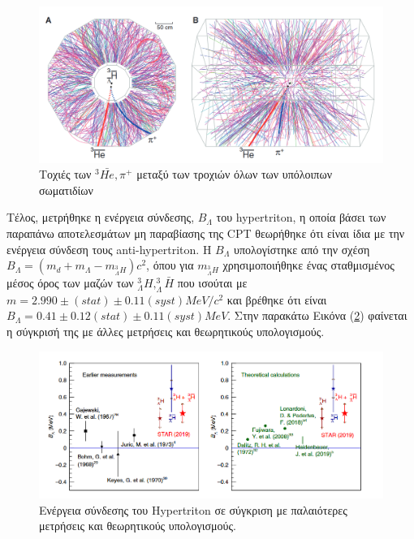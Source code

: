 			\begin{figure}[h!]
				\centering
				\includegraphics[scale=0.5]{STAR_Results/hypertriton_traj}
				\caption{Τοχιές των $ ^3\bar{He}, \pi^+$ μεταξύ των τροχιών όλων των υπόλοιπων σωματιδίων }
				\label{fig4.13}
			\end{figure}
			
Τέλος, μετρήθηκε η ενέργεια σύνδεσης, $B_\Lambda$ του hypertriton, η οποία βάσει των παραπάνω αποτελεσμάτων μη παραβίασης της CPT θεωρήθηκε ότι είναι ίδια με την ενέργεια σύνδεση τους anti-hypertriton. H $B_\Lambda$ υπολογίστηκε από την σχέση $B_\Lambda = (m_d+m_\Lambda -m_{^3_{\Lambda}H})c^2$, 
όπου για $m_{^3_{\Lambda}H}$ χρησιμοποιήθηκε ένας σταθμισμένος μέσος όρος των μαζών των $^3_{\Lambda}H, ^3_{\Lambda}\bar{H}$ που ισούται με $m=2.990\pm(stat)\pm0.11(syst)MeV/c^2$ και
 βρέθηκε ότι είναι $B_\Lambda=0.41\pm0.12(stat)\pm0.11(syst) MeV$. Στην παρακάτω Εικόνα (\ref{fig4.14}) φαίνεται η σύγκρισή της με άλλες μετρήσεις και θεωρητικούς υπολογισμούς.

\begin{figure}[h!]
		\centering
		\includegraphics[scale=0.6]{STAR_Results/hypertriton_binding}
		\caption{Ενέργεια σύνδεσης του Hypertriton σε σύγκριση με παλαιότερες μετρήσεις και θεωρητικούς υπολογισμούς.}
		\label{fig4.14}
	\end{figure}
		
